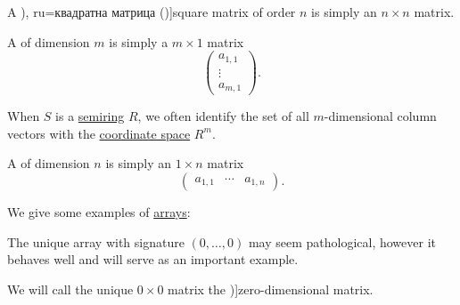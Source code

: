 \begin{definition}
\begin{thmenum}
     A \term[bg=квадратна матрица (\cite[18]{Обрешков1962ВисшаАлгебра}), ru=квадратна матрица (\cite[\S 1.1]{Тыртышников2007ЛинейнаяАлгебра})]{square matrix} of order \( n \) is simply an \( n \times n \) matrix.

     A  of dimension \( m \) is simply a \( m \times 1 \) matrix
    \begin{equation*}
      \begin{pmatrix}
        a_{1,1} \\
        \vdots  \\
        a_{m,1}
      \end{pmatrix}.
    \end{equation*}

    When \( S \) is a \hyperref[def:semiring]{semiring} \( R \), we often identify the set of all \( m \)-dimensional column vectors with the \hyperref[def:coordinate_space]{coordinate space} \( R^m \).

     A  of dimension \( n \) is simply an \( 1 \times n \) matrix
    \begin{equation*}
      \begin{pmatrix}
        a_{1,1} & \cdots & a_{1,n}
      \end{pmatrix}.
    \end{equation*}
  \end{thmenum}
\end{definition}

\begin{example}\label{ex:def:array}
  We give some examples of \hyperref[def:array]{arrays}:
  \begin{thmenum}
     The unique array with signature \( (0, \ldots, 0) \) may seem pathological, however it behaves well and will serve as an important example.

    We will call the unique \( 0 \times 0 \) matrix the \term[en=zero-dimensional matrix (\cite[example 1.5.19]{Perrone2024StartingCategoryTheory})]{zero-dimensional matrix}.
  \end{thmenum}
\end{example}

